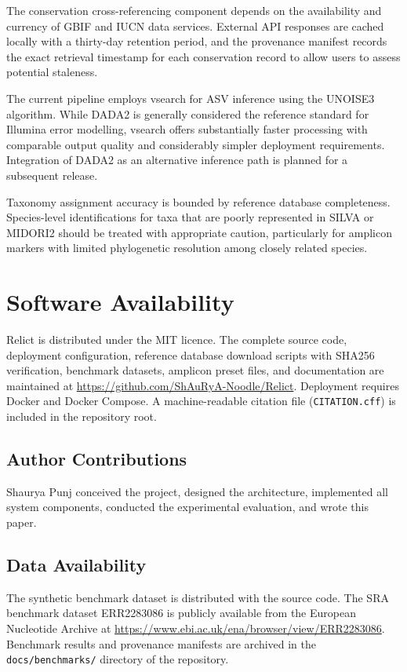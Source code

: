 \documentclass[runningheads]{llncs}
\begin{document}
The conservation cross-referencing component depends on the availability and currency of GBIF and IUCN data services. External API responses are cached locally with a thirty-day retention period, and the provenance manifest records the exact retrieval timestamp for each conservation record to allow users to assess potential staleness.

The current pipeline employs vsearch for ASV inference using the UNOISE3 algorithm. While DADA2 \cite{callahan2016} is generally considered the reference standard for Illumina error modelling, vsearch offers substantially faster processing with comparable output quality and considerably simpler deployment requirements. Integration of DADA2 as an alternative inference path is planned for a subsequent release.

Taxonomy assignment accuracy is bounded by reference database completeness. Species-level identifications for taxa that are poorly represented in SILVA or MIDORI2 should be treated with appropriate caution, particularly for amplicon markers with limited phylogenetic resolution among closely related species.

\section{Software Availability}

Relict is distributed under the MIT licence. The complete source code, deployment configuration, reference database download scripts with SHA256 verification, benchmark datasets, amplicon preset files, and documentation are maintained at \url{https://github.com/ShAuRyA-Noodle/Relict}. Deployment requires Docker and Docker Compose. A machine-readable citation file (\texttt{CITATION.cff}) is included in the repository root.

\subsection*{Author Contributions}

Shaurya Punj conceived the project, designed the architecture, implemented all system components, conducted the experimental evaluation, and wrote this paper.

\subsection*{Data Availability}

The synthetic benchmark dataset is distributed with the source code. The SRA benchmark dataset ERR2283086 is publicly available from the European Nucleotide Archive at \url{https://www.ebi.ac.uk/ena/browser/view/ERR2283086}. Benchmark results and provenance manifests are archived in the \texttt{docs/benchmarks/} directory of the repository.
\end{document}
